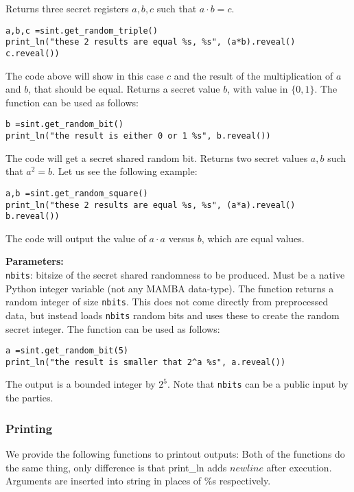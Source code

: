 Returns three secret registers $a, b, c$ such that $a\cdot b = c$.
\begin{lstlisting}
a,b,c =sint.get_random_triple()
print_ln("these 2 results are equal %s, %s", (a*b).reveal() c.reveal())
\end{lstlisting}
The code above will show in this case $c$ and the result of the multiplication of $a$ and $b$, that should be equal.
Returns a secret value $b$, with value in $\{0, 1\}$. The function can be used as follows:
\begin{lstlisting}
b =sint.get_random_bit()
print_ln("the result is either 0 or 1 %s", b.reveal())
\end{lstlisting}
The code will get a secret shared random bit.
Returns two secret values $a, b$ such that $a^2 = b$. Let us see the following example:
\begin{lstlisting}
a,b =sint.get_random_square()
print_ln("these 2 results are equal %s, %s", (a*a).reveal() b.reveal())
\end{lstlisting}
The code will output the value of $a \cdot a$ versus $b$,  which are equal values.

\textbf{Parameters:}\\
\verb|nbits|: bitsize of the secret shared randomness to be produced. Must be a native Python integer variable (not any MAMBA data-type).
The function returns a random integer of size \verb|nbits|. This does not come directly from preprocessed data, but instead loads \verb|nbits| random bits and uses these to create the random secret integer. The function can be used as follows:
\begin{lstlisting}
a =sint.get_random_bit(5)
print_ln("the result is smaller that 2^a %s", a.reveal())
\end{lstlisting}
The output is a bounded integer by $2^5$. Note that \verb|nbits| can be a public input by the parties.

\subsubsection{Printing}
We provide the following functions to printout outputs:
Both of the functions do the same thing, only difference is that print_ln adds $newline$ after execution. Arguments are inserted into string in places of $\%$s respectively.

